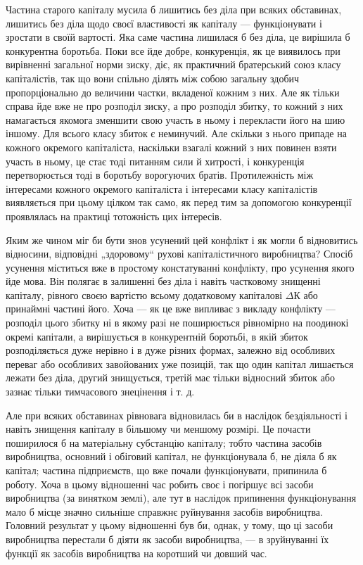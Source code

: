 
Частина старого капіталу мусила б лишитись без діла при
всяких обставинах, лишитись без діла щодо своєї властивості як
капіталу — функціонувати і зростати в своїй вартості. Яка саме
частина лишилася б без діла, це вирішила б конкурентна боротьба.
Поки все йде добре, конкуренція, як це виявилось при
вирівненні загальної норми зиску, діє, як практичний братерський
союз класу капіталістів, так що вони спільно ділять між собою загальну
здобич пропорціонально до величини частки, вкладеної
кожним з них. Але як тільки справа йде вже не про розподіл
зиску, а про розподіл збитку, то кожний з них намагається
якомога зменшити свою участь в ньому і перекласти його на
шию іншому. Для всього класу збиток є неминучий. Але скільки
з нього припаде на кожного окремого капіталіста, наскільки
взагалі кожний з них повинен взяти участь в ньому, це стає
тоді питанням сили й хитрості, і конкуренція перетворюється
тоді в боротьбу ворогуючих братів. Протилежність між інтересами
кожного окремого капіталіста і інтересами класу капіталістів виявляється
при цьому цілком так само, як перед тим за допомогою
конкуренції проявлялась на практиці тотожність цих інтересів.

Яким же чином міг би бути знов усунений цей конфлікт
і як могли б відновитись відносини, відповідні „здоровому“
рухові капіталістичного виробництва? Спосіб усунення міститься
вже в простому констатуванні конфлікту, про усунення якого
йде мова. Він полягає в залишенні без діла і навіть частковому
знищенні капіталу, рівного своєю вартістю всьому додатковому
капіталові $ΔК$ або принаймні частині його. Хоча — як
це вже випливає з викладу конфлікту — розподіл цього збитку
ні в якому разі не поширюється рівномірно на поодинокі окремі
капітали, а вирішується в конкурентній боротьбі, в якій збиток
розподіляється дуже нерівно і в дуже різних формах, залежно
від особливих переваг або особливих завойованих уже позицій,
так що один капітал лишається лежати без діла, другий знищується,
третій має тільки відносний збиток або зазнає тільки
тимчасового знецінення і т. д.

Але при всяких обставинах рівновага відновилась би в наслідок
бездіяльності і навіть знищення капіталу в більшому чи
меншому розмірі. Це почасти поширилося б на матеріальну
субстанцію капіталу; тобто частина засобів виробництва, основний
і обіговий капітал, не функціонувала б, не діяла б як капітал;
частина підприємств, що вже почали функціонувати, припинила
б роботу. Хоча в цьому відношенні час робить своє
і погіршує всі засоби виробництва (за винятком землі), але тут
в наслідок припинення функціонування мало б місце значно
сильніше справжнє руйнування засобів виробництва. Головний
результат у цьому відношенні був би, однак, у тому, що ці засоби
виробництва перестали б діяти як засоби виробництва, — в зруйнуванні
їх функції як засобів виробництва на коротший чи довший
час.
